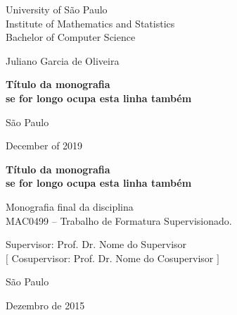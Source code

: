 \documentclass[11pt,twoside,a4paper]{book}
\begin{document}
\frontmatter 
\fancyhead[RO]{{\footnotesize\rightmark}\hspace{2em}\thepage}
\setcounter{tocdepth}{2}
\fancyhead[LE]{\thepage\hspace{2em}\footnotesize{\leftmark}}
\fancyhead[RE,LO]{}
\fancyhead[RO]{{\footnotesize\rightmark}\hspace{2em}\thepage}

\onehalfspacing  %


\thispagestyle{empty}
\begin{center}
    \vspace*{2.3cm}
    University of São Paulo\\
    Institute of Mathematics and Statistics\\
    Bachelor of Computer Science


    \vspace*{3cm}
    \Large{Juliano Garcia de Oliveira}
    

    \vspace{3cm}
    \textbf{\Large{Título da monografia \\
    se for longo ocupa esta linha também}}
    
       
    \vskip 5cm
    \normalsize{São Paulo}

    \normalsize{December of 2019}
\end{center}


%
\newpage
\thispagestyle{empty}
    \begin{center}
        \vspace*{2.3 cm}
        \textbf{\Large{Título da monografia \\
    se for longo ocupa esta linha também}}
        \vspace*{2 cm}
    \end{center}

    \vskip 2cm

    \begin{flushright}
	Monografia final da disciplina \\
        MAC0499 -- Trabalho de Formatura Supervisionado.
    \end{flushright}

    \vskip 5cm

    \begin{center}
    Supervisor: Prof. Dr. Nome do Supervisor\\
    $[$ Cosupervisor: Prof. Dr. Nome do Cosupervisor $]$

    \vskip 5cm
    \normalsize{São Paulo}

    \normalsize{Dezembro de 2015}
    \end{center}
\pagebreak
\end{document}

